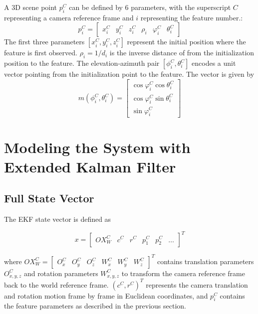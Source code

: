 A 3D scene point $p_{i}^{C}$ can be defined by 6 parameters, with the 
superscript $C$ representing a camera reference frame and $i$
representing the feature number.:
\begin{equation}
p_{i}^{C}=\begin{bmatrix}
x_{i}^{C} & y_{i}^{C} & z_{i}^{C} & \rho _{i} & \varphi _{i}^{C} & 
\theta _{i}^{C} 
\end{bmatrix}
\end{equation}
The first three parameters $[x_{i}^{C}, y_{i}^{C}, z_{i}^{C}]$
represent the initial position where the feature is first observed.
$\rho_{i} = 1/d_i$ is the inverse distance of from the initialization position
to the feature. The elevation-azimuth pair $[\phi_{i}^{C},
\theta_{i}^{C}]$ encodes a unit vector pointing from the
initialization point to the feature. The vector is given by
\begin{equation}
m(\phi_{i}^{C}, \theta_{i}^{C})=\begin{bmatrix}
\cos\varphi_{i}^{C}\cos\theta _{i}^{C} \\
\cos\varphi_{i}^{C}\sin\theta _{i}^{C} \\
\sin\varphi_{i}^{C}
\end{bmatrix}
\end{equation}

\section{Modeling the System with Extended Kalman 
Filter}

\subsection{Full State Vector}

The EKF state vector is defined as 

\begin{equation}
x=\begin{bmatrix}
OX_{W}^{C} & c^{C} & r^{C} & p_{1}^{C} & p_{2}^{C} & \ldots 
\end{bmatrix}^T
\end{equation}

\noindent where $OX_{W}^{C}= \begin{bmatrix}O_{x}^{C} & O_{y}^{C} &
  O_{z}^{C} & W_{x}^{C} & W_{y}^{C} & W_{z}^{C} \end{bmatrix}^{T}$
contains translation parameters $O_{x,y,z}^{C}$ and rotation
parameters $W_{x,y,z}^{C}$ to transform the camera reference frame
back to the world reference frame. $\left(c^{C},r^{C}\right)^{T}$
represents the camera translation and rotation motion frame by frame
in Euclidean coordinates, and $p_{i}^{C}$ contains the feature
parameters as described in the previous section.

